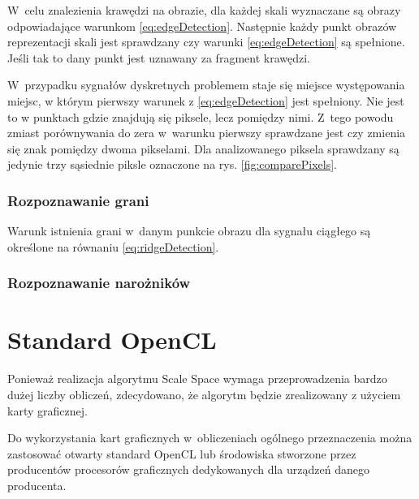 W~celu znalezienia krawędzi na obrazie, dla każdej skali wyznaczane są obrazy odpowiadające warunkom \ref{eq:edgeDetection}. Następnie każdy punkt obrazów reprezentacji skali jest sprawdzany czy warunki \ref{eq:edgeDetection} są spełnione. Jeśli tak to dany punkt jest uznawany za fragment krawędzi.

W~przypadku sygnałów dyskretnych problemem staje się miejsce występowania miejsc, w którym pierwszy warunek z \ref{eq:edgeDetection} jest spełniony. Nie jest to w punktach gdzie znajdują się piksele, lecz pomiędzy nimi. Z~tego powodu zmiast porównywania do zera w~warunku pierwszy sprawdzane jest czy zmienia się znak pomiędzy dwoma pikselami. Dla analizowanego piksela sprawdzany są jedynie trzy sąsiednie piksle oznaczone na rys. \ref{fig:comparePixels}. 


\subsubsection{Rozpoznawanie grani}
\label{subsubsec:rozpoznawanieGrani}

Warunk istnienia grani w~danym punkcie obrazu dla sygnału ciągłego są określone na równaniu \ref{eq:ridgeDetection}.



\subsubsection{Rozpoznawanie narożników}
\label{subsubsec:rozpoznawanieNaroznikow}


\section{Standard OpenCL}
\label{sec:OpenCL}

Ponieważ realizacja algorytmu Scale Space wymaga przeprowadzenia bardzo dużej liczby obliczeń, zdecydowano, że algorytm będzie zrealizowany z użyciem karty graficznej.

Do wykorzystania kart graficznych w~obliczeniach ogólnego przeznaczenia można zastosować otwarty standard OpenCL lub środowiska stworzone przez producentów procesorów graficznych dedykowanych dla urządzeń danego producenta.


